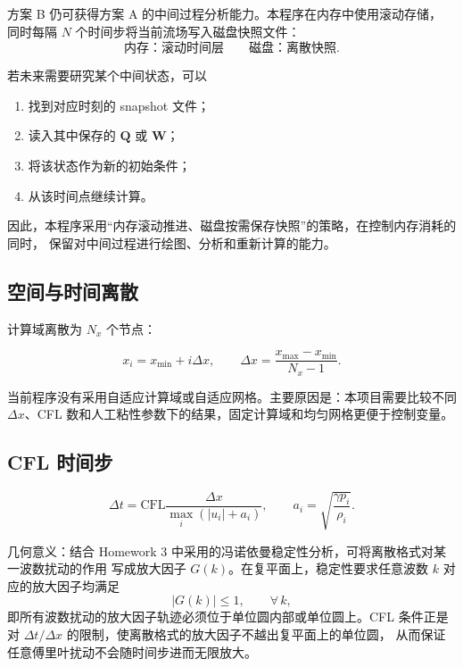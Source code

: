 方案 B 仍可获得方案 A 的中间过程分析能力。本程序在内存中使用滚动存储，
同时每隔 $N$ 个时间步将当前流场写入磁盘快照文件：
\begin{equation}
\text{内存：滚动时间层}
\qquad
\text{磁盘：离散快照}.
\end{equation}

若未来需要研究某个中间状态，可以
\begin{enumerate}[leftmargin=2em]
    \item 找到对应时刻的 snapshot 文件；
    \item 读入其中保存的 $\bm{Q}$ 或 $\bm{W}$；
    \item 将该状态作为新的初始条件；
    \item 从该时间点继续计算。
\end{enumerate}

因此，本程序采用“内存滚动推进、磁盘按需保存快照”的策略，在控制内存消耗的同时，
保留对中间过程进行绘图、分析和重新计算的能力。


\subsection{空间与时间离散}

计算域离散为 $N_x$ 个节点：

\begin{equation}
x_i=x_{\min}+i\Delta x,
\qquad
\Delta x=\frac{x_{\max}-x_{\min}}{N_x-1}.
\end{equation}

当前程序没有采用自适应计算域或自适应网格。主要原因是：本项目需要比较不同
\(\Delta x\)、CFL 数和人工粘性参数下的结果，固定计算域和均匀网格更便于控制变量。

\subsection{CFL 时间步}

\begin{equation}
\Delta t
=
\mathrm{CFL}
\frac{\Delta x}
{\max_i(|u_i|+a_i)},
\qquad
a_i=\sqrt{\frac{\gamma p_i}{\rho_i}}.
\end{equation}

几何意义：结合 Homework 3 中采用的冯诺依曼稳定性分析，可将离散格式对某一波数扰动的作用
写成放大因子 $G(k)$。在复平面上，稳定性要求任意波数 $k$ 对应的放大因子均满足
\begin{equation}
\left|G(k)\right|\leq 1,
\qquad \forall\,k,
\end{equation}
即所有波数扰动的放大因子轨迹必须位于单位圆内部或单位圆上。CFL 条件正是对
$\Delta t/\Delta x$ 的限制，使离散格式的放大因子不越出复平面上的单位圆，
从而保证任意傅里叶扰动不会随时间步进而无限放大。

